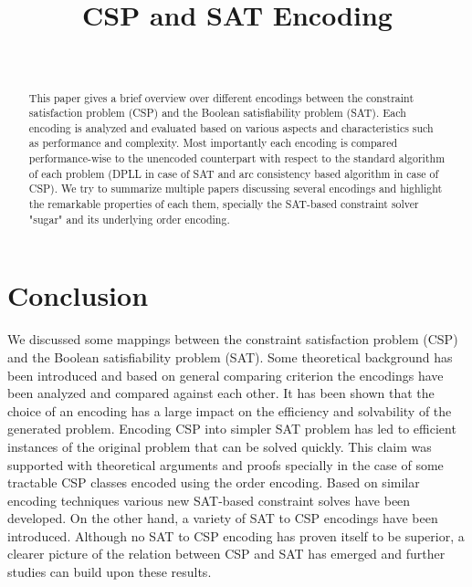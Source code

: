 \documentclass[compsoc,onecolumn,11pt,a4paper,final]{IEEEtran}
\title{CSP and SAT Encoding}
\author{ 
	\IEEEauthorblockN{Mazen Bouchur}\\
	\IEEEauthorblockA{TU Clausthal, Germany}
}
\begin{document}
\maketitle
	
\begin{abstract}\label{abstract}
This paper gives a brief overview over different encodings between the constraint satisfaction problem (CSP) and the Boolean satisfiability problem (SAT). 
Each encoding is analyzed and evaluated based on various aspects and characteristics such as performance and complexity. 
Most importantly each encoding is compared performance-wise to the unencoded counterpart with respect to the standard algorithm of each problem (DPLL in case of SAT and arc consistency based algorithm in case of CSP).
We try to summarize multiple papers discussing several encodings and highlight the remarkable properties of each them, specially the SAT-based constraint solver "sugar" and its underlying order encoding.
\end{abstract}






\section{Conclusion}\label{sec:conclusion}
We discussed some mappings between the constraint satisfaction problem (CSP) and the Boolean satisfiability problem (SAT). Some theoretical background has been introduced and based on general comparing criterion the encodings have been analyzed and compared against each other. It has been shown that the choice of an encoding has a large impact on the efficiency and solvability of the generated problem. Encoding CSP into simpler SAT problem has led to efficient instances of the original problem that can be solved quickly. This claim was supported with theoretical arguments and proofs specially in the case of some tractable CSP classes encoded using the order encoding. Based on similar encoding techniques various new SAT-based constraint solves have been developed. On the other hand, a variety of SAT to CSP encodings have been introduced. Although no SAT to CSP encoding has proven itself to be superior, a clearer picture of the relation between CSP and SAT has emerged and further studies can build upon these results.

\newpage
\nocite{*}


\end{document}
